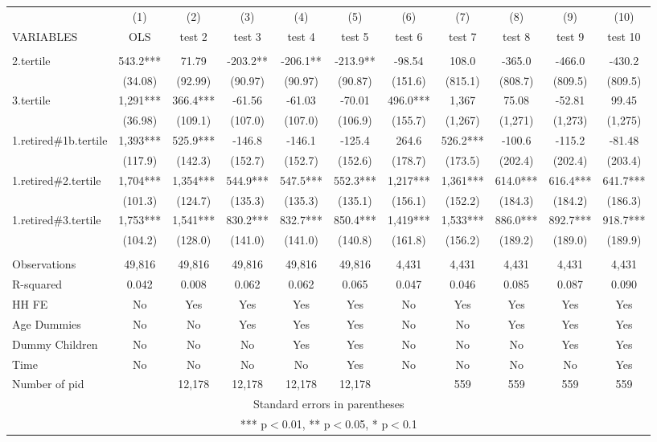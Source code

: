\begin{tabular}{lcccccccccc} \hline
 & (1) & (2) & (3) & (4) & (5) & (6) & (7) & (8) & (9) & (10) \\
VARIABLES & OLS & test 2 & test 3 & test 4 & test 5 & test 6 & test 7 & test 8 & test 9 & test 10 \\ \hline
 &  &  &  &  &  &  &  &  &  &  \\
2.tertile & 543.2*** & 71.79 & -203.2** & -206.1** & -213.9** & -98.54 & 108.0 & -365.0 & -466.0 & -430.2 \\
 & (34.08) & (92.99) & (90.97) & (90.97) & (90.87) & (151.6) & (815.1) & (808.7) & (809.5) & (809.5) \\
3.tertile & 1,291*** & 366.4*** & -61.56 & -61.03 & -70.01 & 496.0*** & 1,367 & 75.08 & -52.81 & 99.45 \\
 & (36.98) & (109.1) & (107.0) & (107.0) & (106.9) & (155.7) & (1,267) & (1,271) & (1,273) & (1,275) \\
1.retired\#1b.tertile & 1,393*** & 525.9*** & -146.8 & -146.1 & -125.4 & 264.6 & 526.2*** & -100.6 & -115.2 & -81.48 \\
 & (117.9) & (142.3) & (152.7) & (152.7) & (152.6) & (178.7) & (173.5) & (202.4) & (202.4) & (203.4) \\
1.retired\#2.tertile & 1,704*** & 1,354*** & 544.9*** & 547.5*** & 552.3*** & 1,217*** & 1,361*** & 614.0*** & 616.4*** & 641.7*** \\
 & (101.3) & (124.7) & (135.3) & (135.3) & (135.1) & (156.1) & (152.2) & (184.3) & (184.2) & (186.3) \\
1.retired\#3.tertile & 1,753*** & 1,541*** & 830.2*** & 832.7*** & 850.4*** & 1,419*** & 1,533*** & 886.0*** & 892.7*** & 918.7*** \\
 & (104.2) & (128.0) & (141.0) & (141.0) & (140.8) & (161.8) & (156.2) & (189.2) & (189.0) & (189.9) \\
 &  &  &  &  &  &  &  &  &  &  \\
Observations & 49,816 & 49,816 & 49,816 & 49,816 & 49,816 & 4,431 & 4,431 & 4,431 & 4,431 & 4,431 \\
R-squared & 0.042 & 0.008 & 0.062 & 0.062 & 0.065 & 0.047 & 0.046 & 0.085 & 0.087 & 0.090 \\
HH FE & No & Yes & Yes & Yes & Yes & No & Yes & Yes & Yes & Yes \\
Age Dummies & No & No & Yes & Yes & Yes & No & No & Yes & Yes & Yes \\
Dummy Children & No & No & No & Yes & Yes & No & No & No & Yes & Yes \\
Time & No & No & No & No & Yes & No & No & No & No & Yes \\
 Number of pid &  & 12,178 & 12,178 & 12,178 & 12,178 &  & 559 & 559 & 559 & 559 \\ \hline
\multicolumn{11}{c}{ Standard errors in parentheses} \\
\multicolumn{11}{c}{ *** p$<$0.01, ** p$<$0.05, * p$<$0.1} \\
\end{tabular}
